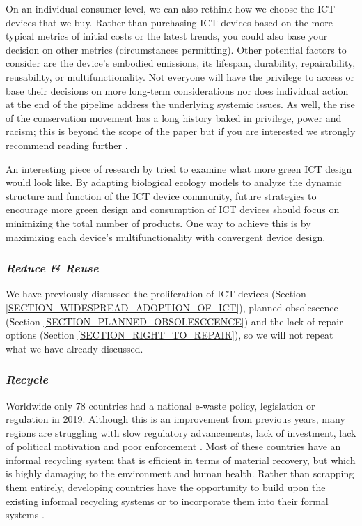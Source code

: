 \documentclass{article}
\begin{document}
On an individual consumer level, we can also rethink how we choose the ICT devices that we buy. Rather than purchasing ICT devices based on the more typical metrics of initial costs or the latest trends, you could also base your decision on other metrics (circumstances permitting). Other potential factors to consider are the device's embodied emissions, its lifespan, durability, repairability, reusability, or multifunctionality. Not everyone will have the privilege to access or base their decisions on more long-term considerations \cite{boddy2016telling} nor does individual action at the end of the pipeline address the underlying systemic issues. As well, the rise of the conservation movement has a long history baked in privilege, power and racism; this is beyond the scope of the paper but if you are interested we strongly recommend reading further \cite{taylor2016rise, purdy2015environmentalracism}.


An interesting piece of research by \cite{ryen2014community} tried to examine what more green ICT design would look like. By adapting biological ecology models to analyze the dynamic structure and function of the ICT device community, future strategies to encourage more green design and consumption of ICT devices should focus on minimizing the total number of products. One way to achieve this is by maximizing each device's multifunctionality with convergent device design.


\subsubsection*{\textit{Reduce \& Reuse}}
We have previously discussed the proliferation of ICT devices (Section \ref{SECTION_WIDESPREAD_ADOPTION_OF_ICT}), planned obsolescence (Section \ref{SECTION_PLANNED_OBSOLESCCENCE}) and the lack of repair options (Section \ref{SECTION_RIGHT_TO_REPAIR}), so we will not repeat what we have already discussed.


\subsubsection*{\textit{Recycle}}
Worldwide only 78 countries had a national e-waste policy, legislation or regulation in 2019. Although this is an improvement from previous years, many regions are struggling with slow regulatory advancements, lack of investment, lack of political motivation and poor enforcement \cite{forti2020global}. Most of these countries have an informal recycling system that is efficient in terms of material recovery, but which is highly damaging to the environment and human health. Rather than scrapping them entirely, developing countries have the opportunity to build upon the existing informal recycling systems or to incorporate them into their formal systems \cite{wilson2006role}.
\end{document}
